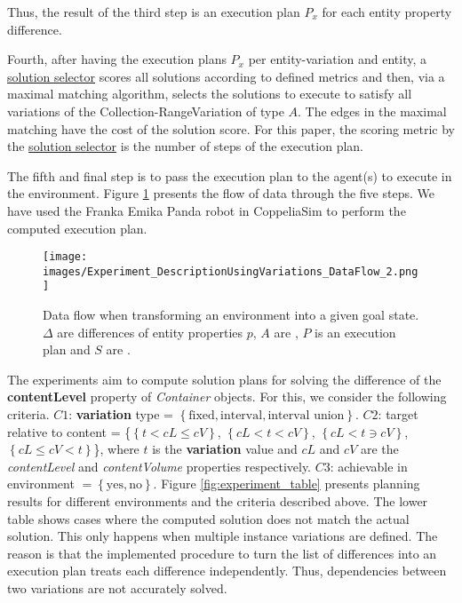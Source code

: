 Thus, the result of the third step is an execution plan $P_x$ for each entity property difference.

Fourth, after having the execution plans $P_x$ per entity-variation and entity, a \underline{solution selector} scores all solutions according to defined metrics and then, via a maximal matching algorithm, selects the solutions to execute to satisfy all variations of the Collection-RangeVariation of type $A$. The edges in the maximal matching have the cost of the solution score. For this paper, the scoring metric by the \underline{solution selector} is the number of steps of the execution plan.

The fifth and final step is to pass the execution plan to the agent(s) to execute in the environment. Figure \ref{fig:data_flow} presents the flow of data through the five steps.
We have used the Franka Emika Panda robot in CoppeliaSim \cite{coppeliaSim} to perform the computed execution plan.

\begin{figure}[t!]
    \centering
    \texttt{[image: images/Experiment\_DescriptionUsingVariations\_DataFlow\_2.png]}
    \caption{Data flow when transforming an environment into a given goal state. $\Delta$ are differences of entity properties $p$, $A$ are \actions, $P$ is an execution plan and $S$ are \skills.} \label{fig:data_flow}
\end{figure}

The experiments aim to compute solution plans for solving the difference of the \textbf{contentLevel} property of \textit{Container} objects. For this, we consider the following criteria. $C1$: \textbf{variation} type = $\left\{\text{fixed},\text{interval},\text{interval union}\right\}$. $C2$: target relative to content = \{$\left\{t < cL \le cV \right\}$, $\left\{cL < t < cV \right\}$, $\left\{cL < t \ni cV \right\}$, $\left\{cL \le cV < t \right\}$\}, where $t$ is the \textbf{variation} value and $cL$ and $cV$ are the \textit{contentLevel} and \textit{contentVolume} properties respectively. $C3$: achievable in environment $ = \left\{\text{yes}, \text{no}\right\}$. Figure \ref{fig:experiment_table} presents planning results for different environments and the criteria described above. The lower table shows cases where the computed solution does not match the actual solution. This only happens when multiple instance variations are defined. The reason is that the implemented procedure to turn the list of differences into an execution plan treats each difference independently. Thus, dependencies between two variations are not accurately solved.

